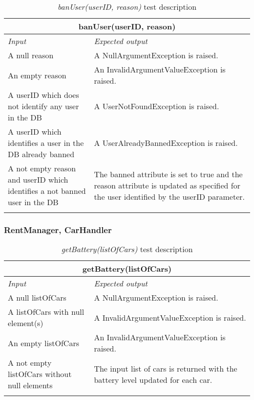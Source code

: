 \begin{longtable}{p{0.35\linewidth}p{0.65\linewidth}}
\multicolumn{2}{c}{\textbf{banUser(userID, reason)}} \\
\toprule
\emph{Input} & \emph{Expected output} \\
\midrule
A null reason & A NullArgumentException is raised.\\
\midrule
An empty reason & An InvalidArgumentValueException is raised.\\
\midrule
A userID which does not identify any user in the DB & A UserNotFoundException is raised.\\
\midrule
A userID which identifies a user in the DB already banned & A UserAlreadyBannedException is raised.\\
\midrule
A not empty reason and userID which identifies a not banned user in the DB & The banned attribute is set to true and the reason attribute is updated as specified for the user identified by the userID parameter.\\
\bottomrule
\caption{\emph{banUser(userID, reason)} test description}
\end{longtable}

\subsubsection{RentManager, CarHandler}

\begin{longtable}{p{0.35\linewidth}p{0.65\linewidth}}
\multicolumn{2}{c}{\textbf{getBattery(listOfCars)}} \\
\toprule
\emph{Input} & \emph{Expected output} \\
\midrule
A null listOfCars & A NullArgumentException is raised.\\
\midrule
A listOfCars with null element(s) & A InvalidArgumentValueException is raised.\\
\midrule
An empty listOfCars & An InvalidArgumentValueException is raised. \\
\midrule
A not empty listOfCars without null elements & The input list of cars is returned with the battery level updated for each car.\\
\bottomrule
\caption{\emph{getBattery(listOfCars)} test description}
\end{longtable}


